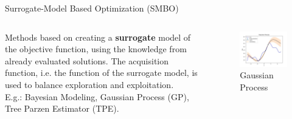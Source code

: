 \begin{frame}{Surrogate-Model Based Optimization (SMBO)}

    \begin{columns}
        \begin{column}{0.5\textwidth}
                Methods based on creating a \textbf{surrogate} model of the objective function, using the knowledge from already evaluated solutions. The acquisition function, i.e. the function of the surrogate model, is used to balance exploration and exploitation. \\
                
                E.g.: Bayesian Modeling, Gaussian Process (GP), Tree Parzen Estimator (TPE).\\
        \end{column}

        \begin{column}{0.5\textwidth}
            \begin{figure}
                \centering
                \includegraphics[width=\linewidth]{imgs/plots/gaussian_process.jpg}
                \caption{Gaussian Process}
            \end{figure}
        \end{column}
    \end{columns}

\end{frame}

